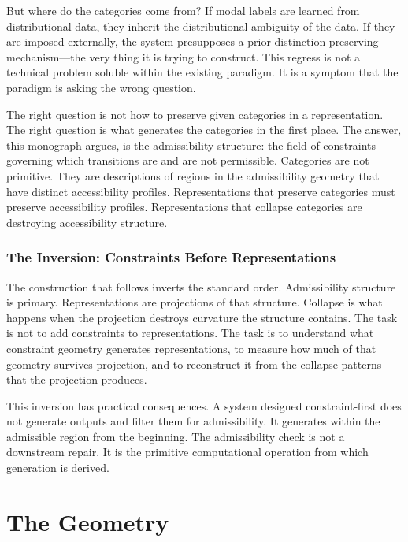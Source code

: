 \documentclass[12pt, oneside]{book}
\theoremstyle{plain-flyxion}
\theoremstyle{definition-flyxion}
\begin{document}
But where do the categories come from? If modal labels are learned from distributional
data, they inherit the distributional ambiguity of the data. If they are imposed
externally, the system presupposes a prior distinction-preserving mechanism---the very
thing it is trying to construct. This regress is not a technical problem soluble within
the existing paradigm. It is a symptom that the paradigm is asking the wrong question.

The right question is not how to preserve given categories in a representation. The right
question is what generates the categories in the first place. The answer, this monograph
argues, is the admissibility structure: the field of constraints governing which
transitions are and are not permissible. Categories are not primitive. They are
descriptions of regions in the admissibility geometry that have distinct accessibility
profiles. Representations that preserve categories must preserve accessibility profiles.
Representations that collapse categories are destroying accessibility structure.

\section{The Inversion: Constraints Before Representations}

The construction that follows inverts the standard order. Admissibility structure is
primary. Representations are projections of that structure. Collapse is what happens when
the projection destroys curvature the structure contains. The task is not to add
constraints to representations. The task is to understand what constraint geometry
generates representations, to measure how much of that geometry survives projection, and
to reconstruct it from the collapse patterns that the projection produces.

This inversion has practical consequences. A system designed constraint-first does not
generate outputs and filter them for admissibility. It generates within the admissible
region from the beginning. The admissibility check is not a downstream repair. It is the
primitive computational operation from which generation is derived.

\part{The Geometry}
\end{document}
